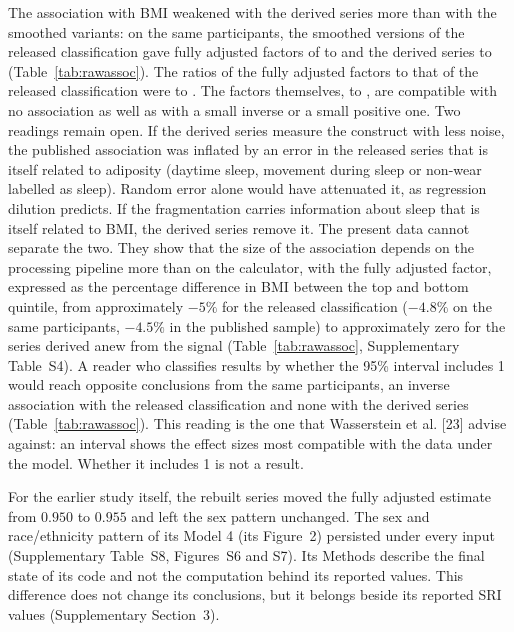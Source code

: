\documentclass[12pt]{article}
\begin{document}
The association with BMI weakened with the derived series more than with the smoothed variants: on the same \rawModelN{} participants, the smoothed versions of the released classification gave fully adjusted factors of \rawSmoothedMBMin{} to \rawSmoothedMBMax{} and the derived series \rawSwanMBEst{} to \rawGgirSibMBEst{} (Table~\ref{tab:rawassoc}). The ratios of the fully adjusted factors to that of the released classification were \rawSwanMBRatioEst{} to \rawGgirSibMBRatioEst. The factors themselves, \rawSwanMBEst{} to \rawGgirSibMBEst, are compatible with no association as well as with a small inverse or a small positive one. Two readings remain open. If the derived series measure the construct with less noise, the published association was inflated by an error in the released series that is itself related to adiposity (daytime sleep, movement during sleep or non-wear labelled as sleep). Random error alone would have attenuated it, as regression dilution predicts. If the fragmentation carries information about sleep that is itself related to BMI,
the derived series remove it. The present data cannot separate the two. They
show that the size of the association depends on the processing pipeline more
than on the calculator, with the fully adjusted factor, expressed as the percentage difference in BMI between the top and bottom quintile, from approximately $-5\%$ for the released classification ($-4.8\%$ on the same participants, $-4.5\%$ in the published sample) to approximately zero for the series derived anew from the signal (Table~\ref{tab:rawassoc}, Supplementary Table~S4). A reader who classifies results by whether the 95\% interval includes 1 would reach opposite conclusions from the same participants, an inverse association with the released classification and none with the derived series (Table~\ref{tab:rawassoc}). This reading is the one that Wasserstein et al. [23] advise against: an interval shows the effect sizes most compatible with the data under the model. Whether it includes 1 is not a result.

For the earlier study itself, the rebuilt series moved the fully adjusted
estimate from $0.950$ to $0.955$ and left the sex pattern unchanged. The sex and race/ethnicity pattern of its Model 4 (its Figure~2) persisted under every input (Supplementary Table~S8, Figures~S6 and S7). Its
Methods describe the final state of its code and not the computation behind
its reported values. This difference does not change its conclusions, but it
belongs beside its reported SRI values (Supplementary Section~3).
\end{document}

